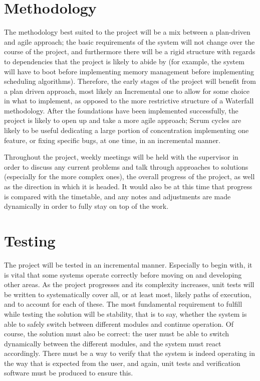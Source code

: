 \documentclass[10pt,a4paper]{article}
\begin{document}
\section*{Methodology}
The methodology best suited to the project will be a mix between a plan-driven
and agile approach; the basic requirements of the system will not change over
the course of the project, and furthermore there will be a rigid structure with
regards to dependencies that the project is likely to abide by (for example, the
system will have to boot before implementing memory management before
implementing scheduling algorithms). Therefore, the early stages of the project
will benefit from a plan driven approach, most likely an Incremental one to
allow for some choice in what to implement, as opposed to the more restrictive
structure of a Waterfall methodology. After the foundations have been
implemented successfully, the project is likely to open up and take a more agile
approach; Scrum cycles are likely to be useful dedicating a large portion of
concentration implementing one feature, or fixing specific bugs, at one time, in
an incremental manner.

Throughout the project, weekly meetings will be held with the supervisor in
order to discuss any current problems and talk through approaches to solutions
(especially for the more complex ones), the overall progress of the project, as
well as the direction in which it is headed. It would also be at this time that
progress is compared with the timetable, and any notes and adjustments are made
dynamically in order to fully stay on top of the work.

\section*{Testing}
The project will be tested in an incremental manner. Especially to begin with,
it is vital that some systems operate correctly before moving on and developing
other areas. As the project progresses and its complexity increases, unit tests
will be written to systematically cover all, or at least most, likely paths of
execution, and to account for each of these. The most fundamental requirement to
fulfill while testing the solution will be stability, that is to say, whether
the system is able to safely switch between different modules and continue
operation. Of course, the solution must also be correct: the user must be able
to switch dynamically between the different modules, and the system must react
accordingly. There must be a way to verify that the system is indeed operating
in the way that is expected from the user, and again, unit tests and
verification software must be produced to ensure this.
\end{document}
